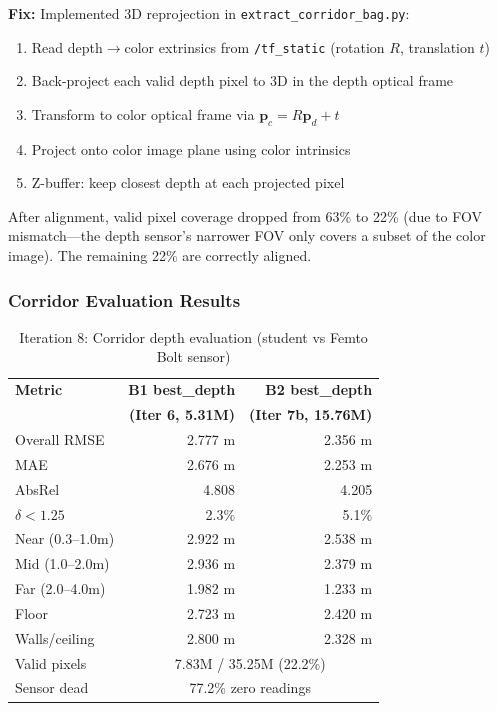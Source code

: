 \documentclass[11pt,a4paper]{article}
\begin{document}
\textbf{Fix:} Implemented 3D reprojection in
\texttt{extract\_corridor\_bag.py}:
\begin{enumerate}[nosep]
  \item Read depth$\to$color extrinsics from \texttt{/tf\_static}
    (rotation $R$, translation $t$)
  \item Back-project each valid depth pixel to 3D in the depth optical frame
  \item Transform to color optical frame via $\mathbf{p}_c = R \mathbf{p}_d + t$
  \item Project onto color image plane using color intrinsics
  \item Z-buffer: keep closest depth at each projected pixel
\end{enumerate}

After alignment, valid pixel coverage dropped from 63\% to 22\% (due to
FOV mismatch---the depth sensor's narrower FOV only covers a subset of
the color image). The remaining 22\% are correctly aligned.

\subsubsection{Corridor Evaluation Results}

\begin{table}[h]
\centering
\caption{Iteration 8: Corridor depth evaluation (student vs Femto Bolt sensor)}
\label{tab:iter8-corridor}
\begin{tabular}{lrr}
\toprule
\textbf{Metric} & \textbf{B1 best\_depth} & \textbf{B2 best\_depth} \\
                 & \textbf{(Iter 6, 5.31M)} & \textbf{(Iter 7b, 15.76M)} \\
\midrule
Overall RMSE     & \textcolor{regression}{2.777 m} & \textcolor{regression}{2.356 m} \\
MAE              & 2.676 m & 2.253 m \\
AbsRel           & 4.808   & 4.205 \\
$\delta < 1.25$  & 2.3\%   & 5.1\% \\
\midrule
Near (0.3--1.0m) & 2.922 m & 2.538 m \\
Mid (1.0--2.0m)  & 2.936 m & 2.379 m \\
Far (2.0--4.0m)  & 1.982 m & 1.233 m \\
\midrule
Floor            & 2.723 m & 2.420 m \\
Walls/ceiling    & 2.800 m & 2.328 m \\
\midrule
Valid pixels     & \multicolumn{2}{c}{7.83M / 35.25M (22.2\%)} \\
Sensor dead      & \multicolumn{2}{c}{77.2\% zero readings} \\
\bottomrule
\end{tabular}
\end{table}
\end{document}
